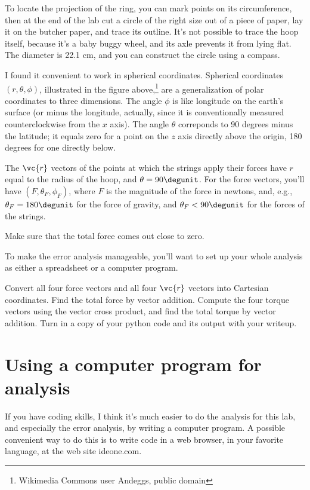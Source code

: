 To locate the projection of the ring, you can mark points on its circumference, then at the end of the lab cut a circle of the right
size out of a piece of paper, lay it on the butcher paper, and trace its outline. It's not possible to trace the hoop itself, because
it's a baby buggy wheel, and its axle prevents it from lying flat. The diameter is 22.1 cm, and you can construct the circle using
a compass.


I found it convenient to work in spherical coordinates. Spherical coordinates $(r,\theta,\phi)$, illustrated in the figure above,\footnote{Wikimedia Commons user Andeggs, public domain} %
are a generalization of polar coordinates to three dimensions. The angle $\phi$ is like longitude on the earth's surface
(or minus the longitude, actually, since it is conventionally measured counterclockwise from the $x$ axis).
The angle $\theta$ correponds to 90 degrees minus the latitude; it equals zero for a point on the $z$ axis directly above the origin, 180 degrees
for one directly below.

The $\vc{r}$ vectors of the points
at which the strings apply their forces have $r$ equal to the radius of the hoop, and $\theta=90 \degunit$. For the force vectors,
you'll have $(F,\theta_F,\phi_F)$, where $F$ is the magnitude of the force in newtons, and, e.g., $\theta_F=180\degunit$ for the
force of gravity, and $\theta_F<90\degunit$ for the forces of the strings.

\selfcheck

Make sure that the total force comes out close to zero.

\analysis

To make the error analysis manageable, you'll want to set up your whole analysis as either a spreadsheet or
a computer program.

Convert all four force vectors and all four $\vc{r}$ vectors into Cartesian coordinates. Find the total force by vector addition.
Compute the four torque vectors using the vector cross product, and find the total torque by vector addition.
Turn in a copy of your python code and its output with your writeup. 

\section*{Using a computer program for analysis}

If you have coding skills, I think it's much easier to do the analysis for this
lab, and especially the error analysis, by writing a computer program. A possible
convenient way to do this is to write code in a web browser, in your favorite language,
at the web site ideone.com. 

